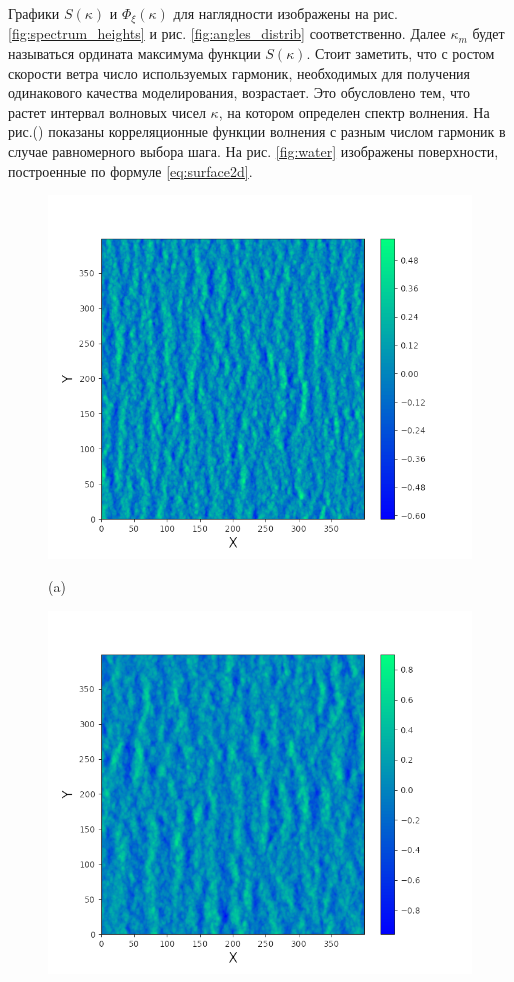 Графики $S(\kappa)$ и  $\Phi_\xi(\kappa)$ для наглядности изображены на рис.
\ref{fig:spectrum_heights} и рис. \ref{fig:angles_distrib} соответственно.
Далее $\kappa_m$ будет называться ордината максимума функции  $S(\kappa)$. Стоит
заметить, что с ростом скорости ветра число используемых гармоник, необходимых
для получения одинакового качества моделирования,
возрастает. 
Это обусловлено тем, что растет интервал волновых чисел $\kappa$, на котором
определен спектр волнения. На рис.() показаны корреляционные функции волнения с
разным числом гармоник в случае равномерного выбора шага. 
На рис. \ref{fig:water} изображены поверхности,
построенные по формуле \eqref{eq:surface2d}.

\begin{figure}[h!]
    \begin{minipage}{0.49\linewidth}
        \centering
        \includegraphics[width=\linewidth]{img/water5}

        (a)
    \end{minipage}
    \begin{minipage}{0.49\linewidth}
        \centering
        \includegraphics[width=\linewidth]{img/water6}


\end{minipage}
\end{figure}
